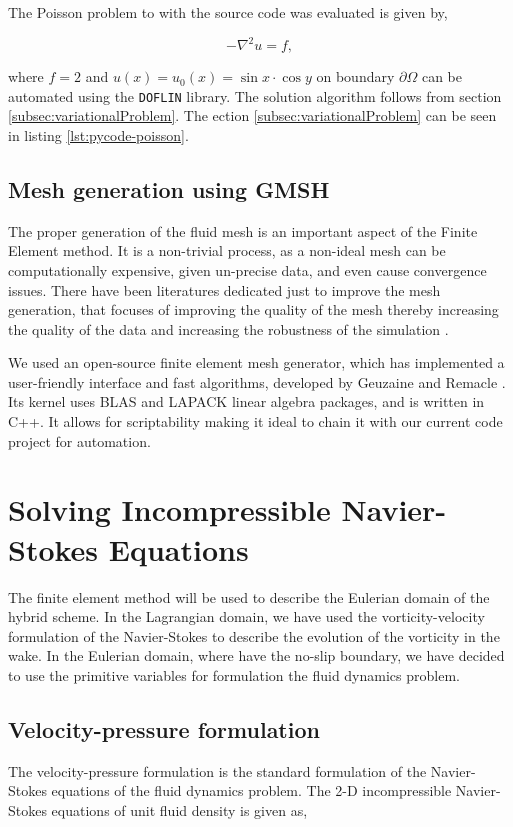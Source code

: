 The Poisson problem to with the source code was evaluated is given by,

	\begin{equation}
	-\nabla^2 u = f,
	\end{equation}

where $f=2$ and $u(x) = u_0(x) = \sin x \cdot \cos y$ on boundary $\partial \Omega$ can be automated using the \texttt{DOFLIN} library. The solution algorithm follows from section \ref{subsec:variationalProblem}. The ection \ref{subsec:variationalProblem} can be seen in listing \ref{lst:pycode-poisson}.

\subsection{Mesh generation using GMSH}

The proper generation of the fluid mesh is an important aspect of the Finite Element method. It is a non-trivial process, as a non-ideal mesh can be computationally expensive, given un-precise data, and even cause convergence issues. There have been literatures dedicated just to improve the mesh generation, that focuses of improving the quality of the mesh thereby increasing the quality of the data and increasing the robustness of the simulation \cite{Hansen2005}. 

We used \gmsh an open-source finite element mesh generator, which has implemented a user-friendly interface and fast algorithms, developed by Geuzaine and Remacle \cite{Geuzaine2009a}. Its kernel uses \textsc{BLAS} and LAPACK linear algebra packages, and is written in C++. It allows for scriptability making it ideal to chain it with our current \python code project for automation.

\section{Solving Incompressible Navier-Stokes Equations}
The finite element method will be used to describe the Eulerian domain of the hybrid scheme. In the Lagrangian domain, we have used the vorticity-velocity formulation of the Navier-Stokes to describe the evolution of the vorticity in the wake. In the Eulerian domain, where have the no-slip boundary, we have decided to use the primitive variables for formulation the fluid dynamics problem. 

\subsection{Velocity-pressure formulation}
The velocity-pressure formulation is the standard formulation of the Navier-Stokes equations of the fluid dynamics problem. The 2-D incompressible Navier-Stokes equations of unit fluid density is given as,

